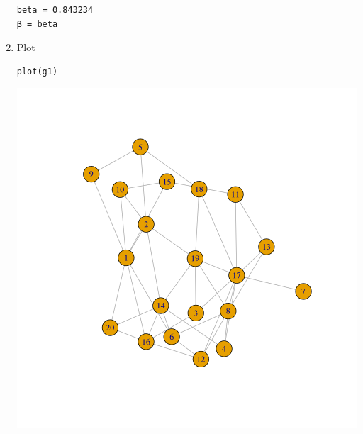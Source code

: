 \documentclass[11pt]{article}
\begin{document}
\begin{enumerate}
\begin{verbatim}
beta = 0.843234
β = beta
\end{verbatim}
\item Plot
\label{sec:orgd1e1d18}

\begin{verbatim}
plot(g1)
\end{verbatim}

\begin{center}
\includegraphics[width=.9\linewidth]{./Media/Example-graph-plot-debug-power-walk.png}
\end{center}
\end{enumerate}
\end{document}
